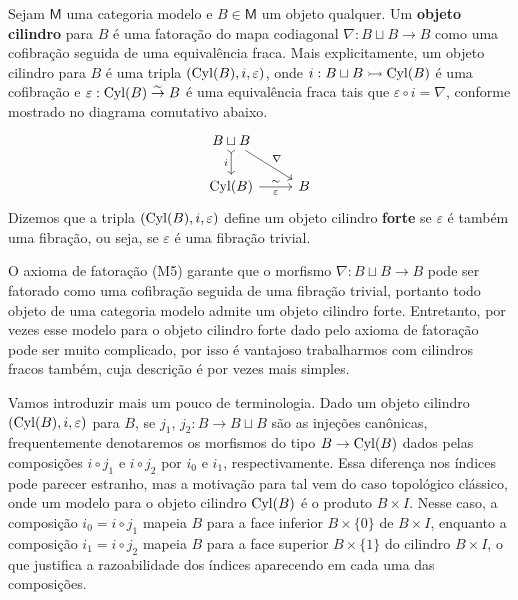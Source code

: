 \begin{defin}
  Sejam $\mathsf{M}$ uma categoria modelo e $B \in \mathsf{M}$ um objeto qualquer.
  Um \textbf{objeto cilindro} para $B$ é uma fatoração do mapa codiagonal $\nabla: B \sqcup B \to B$ como uma cofibração seguida de uma equivalência fraca.
  Mais explicitamente, um objeto cilindro para $B$ é uma tripla $(\mathrm{Cyl}(B),i,\varepsilon)$, onde $i: B \sqcup B \rightarrowtail \mathrm{Cyl}(B)$ é uma cofibração e $\varepsilon: \mathrm{Cyl}(B) \overset{\sim}{\to} B$ é uma equivalência fraca tais que $\varepsilon \circ i = \nabla$, conforme mostrado no diagrama comutativo abaixo.
  \begin{displaymath}
    \begin{tikzcd}
      B \sqcup B
      \arrow[d, tail, "i" swap]
      \arrow[rd, "\nabla"]
      \\ \Cyl(B)
      \arrow[r, "\varepsilon" {swap}, "\sim"]
      & B
    \end{tikzcd}
  \end{displaymath}
  Dizemos que a tripla $(\mathrm{Cyl}(B),i,\varepsilon)$ define um objeto cilindro \textbf{forte} se $\varepsilon$ é também uma fibração, ou seja, se $\varepsilon$ é uma fibração trivial.
\end{defin}

\begin{obs}
  O axioma de fatoração (M5) garante que o morfismo $\nabla: B \sqcup B \to B$ pode ser fatorado como uma cofibração seguida de uma fibração trivial, portanto todo objeto de uma categoria modelo admite um objeto cilindro forte.
  Entretanto, por vezes esse modelo para o objeto cilindro forte dado pelo axioma de fatoração pode ser muito complicado, por isso é vantajoso trabalharmos com cilindros fracos também, cuja descrição é por vezes mais simples.
\end{obs}

Vamos introduzir mais um pouco de terminologia.
Dado  um objeto cilindro $(\mathrm{Cyl}(B),i,\varepsilon)$ para $B$, se $j_{1},\, j_{2}: B \to B \sqcup B$ são as injeções canônicas, frequentemente denotaremos os morfismos do tipo $B \to \mathrm{Cyl}(B)$ dados pelas composições $i \circ j_{1}$ e $i \circ j_{2}$ por $i_{0}$ e $i_{1}$, respectivamente.
Essa diferença nos índices pode parecer estranho, mas a motivação para tal vem do caso topológico clássico, onde um modelo para o objeto cilindro $\mathrm{Cyl}(B)$ é o produto $B \times I$.
Nesse caso, a composição $i_{0} = i \circ j_{1}$ mapeia $B$ para a face inferior $B \times \{0\}$ de $B \times I$, enquanto a composição $i_{1} = i \circ j_{2}$ mapeia $B$ para a face superior $B \times \{1\}$ do cilindro $B \times I$, o que justifica a razoabilidade dos índices aparecendo em cada uma das composições.

